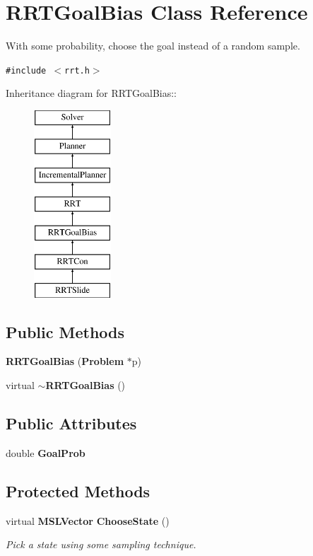 \section{RRTGoal\-Bias  Class Reference}
\label{class_RRTGoalBias}
With some probability, choose the goal instead of a random sample. 


{\tt \#include $<$rrt.h$>$}

Inheritance diagram for RRTGoal\-Bias::\begin{figure}[H]
\begin{center}
\leavevmode
\includegraphics[height=7cm]{class_RRTGoalBias}
\end{center}
\end{figure}
\subsection*{Public Methods}
\begin{CompactItemize}
\item 
{\bf RRTGoal\-Bias} ({\bf Problem} $\ast$p)
\item 
virtual {\bf $\sim$RRTGoal\-Bias} ()
\end{CompactItemize}
\subsection*{Public Attributes}
\begin{CompactItemize}
\item 
double {\bf Goal\-Prob}
\end{CompactItemize}
\subsection*{Protected Methods}
\begin{CompactItemize}
\item 
virtual {\bf MSLVector} {\bf Choose\-State} ()
\begin{CompactList}\small\item\em Pick a state using some sampling technique.\item\end{CompactList}\end{CompactItemize}


